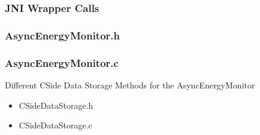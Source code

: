     \subsubsection{JNI Wrapper Calls}
        \begin{framed}
            \lstset{language=C}
            
        \end{framed}
    \subsubsection{AsyncEnergyMonitor.h}
       \begin{framed}
            \lstset{language=C}
            
        \end{framed}
    \subsubsection{AsyncEnergyMonitor.c}
        \begin{framed}
            \lstset{language=C}
            
        \end{framed}
    Different CSide Data Storage Methods for the AsyncEnergyMonitor
    \begin{itemize}
       \item CSideDataStorage.h
            \begin{framed}
                \lstset{language=C}
                
            \end{framed}
        \item CSideDataStorage.c
            \begin{framed}
                \lstset{language=C}
                
            \end{framed}
    \end{itemize}